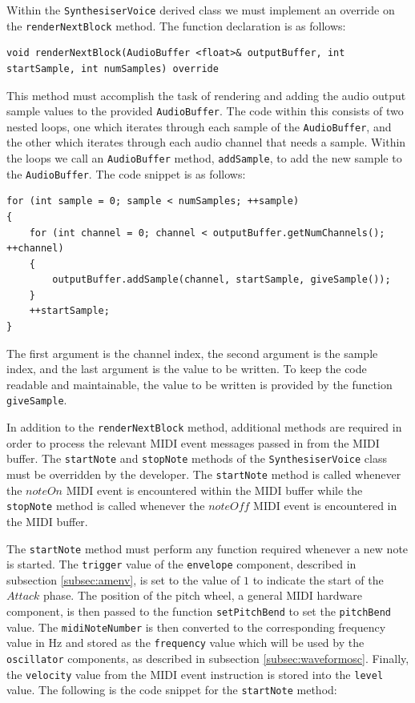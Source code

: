 \documentclass[a4paper,12pt]{report}
\begin{document}
Within the \texttt{SynthesiserVoice} derived class we must implement an override on the \texttt{renderNextBlock} method. The function declaration is as follows:
\begin{lstlisting}[caption={renderNextBlock() Override},label={code:rendernextblockoverride},captionpos=b]
void renderNextBlock(AudioBuffer <float>& outputBuffer, int startSample, int numSamples) override
\end{lstlisting}
This method must accomplish the task of rendering and adding the audio output sample values to the provided \texttt{AudioBuffer}. The code within this consists of two nested loops, one which iterates through each sample of the \texttt{AudioBuffer}, and the other which iterates through each audio channel that needs a sample. Within the loops we call an \texttt{AudioBuffer} method, \texttt{addSample}, to add the new sample to the \texttt{AudioBuffer}. The code snippet is as follows:
\begin{lstlisting}[caption={addSample()},label={code:addsample},captionpos=b]
for (int sample = 0; sample < numSamples; ++sample)
{
    for (int channel = 0; channel < outputBuffer.getNumChannels(); ++channel)
    {
        outputBuffer.addSample(channel, startSample, giveSample());
    }
    ++startSample;
}
\end{lstlisting}
The first argument is the channel index, the second argument is the sample index, and the last argument is the value to be written. To keep the code readable and maintainable, the value to be written is provided by the function \texttt{giveSample}. 

In addition to the \texttt{renderNextBlock} method, additional methods are required in order to process the relevant MIDI event messages passed in from the MIDI buffer. The \texttt{startNote} and \texttt{stopNote} methods of the \texttt{SynthesiserVoice} class must be overridden by the developer. The \texttt{startNote} method is called whenever the $noteOn$ MIDI event is encountered within the MIDI buffer while the \texttt{stopNote} method is called whenever the $noteOff$ MIDI event is encountered in the MIDI buffer.	

The \texttt{startNote} method must perform any function required whenever a new note is started. The \texttt{trigger} value of the \texttt{envelope} component, described in subsection \ref{subsec:amenv}, is set to the value of $1$ to indicate the start of the $Attack$ phase. The position of the pitch wheel, a general MIDI hardware component, is then passed to the function \texttt{setPitchBend} to set the \texttt{pitchBend} value. The \texttt{midiNoteNumber} is then converted to the corresponding frequency value in Hz and stored as the \texttt{frequency} value which will be used by the \texttt{oscillator} components, as described in subsection \ref{subsec:waveformosc}. Finally, the \texttt{velocity} value from the MIDI event instruction is stored into the \texttt{level} value. The following is the code snippet for the \texttt{startNote} method:
\end{document}
